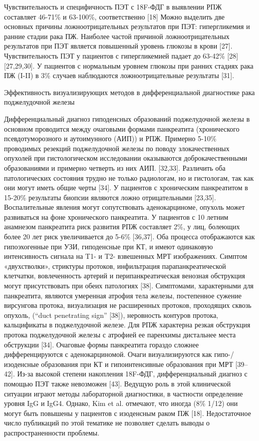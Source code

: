 Чувствительность и специфичность ПЭТ с 18F-ФДГ в выявлении РПЖ составляет 46-71\% и 63-100\%, соответственно [18] 
Можно выделить две основных причины ложноотрицательных результатов при ПЭТ: гипергликемия и ранние стадии рака ПЖ. Наиболее частой причиной ложноотрицательных результатов при ПЭТ является повышенный уровень глюкозы в крови [27]. Чувствительность ПЭТ у пациентов с гипергликемией падает до 63-42\% [28][27,29,30]. 
У пациентов с нормальным уровнем глюкозы при ранних стадиях рака ПЖ (I-II) в 3\% случаев наблюдаются ложноотрицательные результаты [31].

Эффективность визуализирующих методов в дифференциальной диагностике рака поджелудочной железы

Дифференциальный диагноз гиподенсных образований поджелудочной железы в основном проводится между очаговыми формами панкреатита (хронического псевдотуморозного и аутоимунного (АИП)) и РПЖ. Примерно 5-10\% проводимых резекций поджелудочной железы по поводу злокачественных опухолей при гистологическом исследовании оказываются доброкачественными образованиями и примерно четверть из них АИП. [32,33]. Различить оба патологических состояния трудно не только радиологам, но и гистологам, так как они могут иметь общие черты [34]. У пациентов с хроническим панкреатитом в 15-20\% результаты биопсии являются ложно отрицательными [23,35].
Воспалительные явления могут сопутствовать аденокарциноме, опухоль может развиваться на фоне хронического панкреатита. У пациентов с 10 летним анамнезом панкреатита риск развития РПЖ составляет 2\%, у лиц, болеющих более 20 лет риск увеличивается до 5-6\% [36,37].
Оба процесса отображаются как гипоэхогенные при УЗИ, гиподенсные при КТ, и имеют одинаковую интенсивность сигнала на T1- и T2- взвешенных МРТ изображениях. Симптом «двухстволки», стриктуры протоков, инфильтрация парапанкреатической клетчатки, вовлеченность артерий и перипанкреатическая венозная обструкция могут присутствовать при обеих патологиях [38].
Симптомами, характерными для панкреатита, являются умеренная атрофия тела железы, постепенное сужение вирсунгова протока, визуализация не расширенных протоков, проходящих сквозь опухоль, (“duct penetrating sign” [38]), неровность контуров протока, кальцификаты в поджелудочной железе. Для РПЖ характерна резкая обструкция протока поджелудочной железы с атрофией ее паренхимы дистальнее места обструкции [34].
Очаговые формы панкреатита гораздо сложнее дифференцируются с аденокарциномой. Очаги визуализируются как гипо-/изоденсные образования при КТ и гипоинтенсивные образования при МРТ [39–42]. Из-за высокой степени накопления 18F-ФДГ, дифференциальный диагноз с помощью ПЭТ также невозможен [43]. Ведущую роль в этой клинической ситуации играют методы лабораторной диагностики, в частности определение уровня IgG и IgG4. Однако, Kim et al. отмечают, что иногда (8\% 1/12) они могут быть повышены у пациентов с изоденсным раком ПЖ [18]. Недостаточное число публикаций по этой тематике не позволяет сделать выводы о распространенности проблемы.
